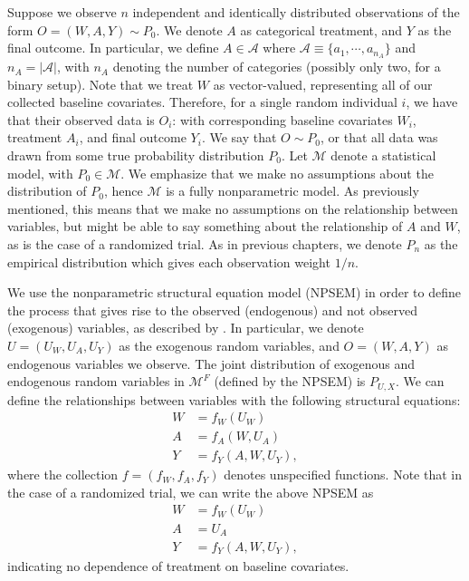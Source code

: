 \documentclass[12pt, krantz2,]{book}
\theoremstyle{definition}
\theoremstyle{definition}
\theoremstyle{definition}
\newcommand{\1}{\mathbbm{1}}
\begin{document}
Suppose we observe \(n\) independent and identically distributed observations of
the form \(O=(W,A,Y) \sim P_0\). We denote \(A\) as categorical treatment, and \(Y\)
as the final outcome. In particular, we define \(A \in \mathcal{A}\) where
\(\mathcal{A} \equiv \{a_1, \cdots, a_{n_A} \}\) and \(n_A = |\mathcal{A}|\), with
\(n_A\) denoting the number of categories (possibly only two, for a binary setup).
Note that we treat \(W\) as vector-valued, representing all of our collected
baseline covariates. Therefore, for a single random individual \(i\), we have that
their observed data is \(O_i\): with corresponding baseline covariates \(W_i\),
treatment \(A_i\), and final outcome \(Y_i\). We say that \(O \sim P_0\), or that all
data was drawn from some true probability distribution \(P_0\). Let \(\mathcal{M}\)
denote a statistical model, with \(P_0 \in \mathcal{M}\). We emphasize that we
make no assumptions about the distribution of \(P_0\), hence \(\mathcal{M}\) is a
fully nonparametric model. As previously mentioned, this means that we make no
assumptions on the relationship between variables, but might be able to say
something about the relationship of \(A\) and \(W\), as is the case of a randomized
trial. As in previous chapters, we denote \(P_n\) as the empirical distribution
which gives each observation weight \(1/n\).

We use the nonparametric structural equation model (NPSEM) in order to define
the process that gives rise to the observed (endogenous) and not observed
(exogenous) variables, as described by \citet{pearl2009causality}. In particular, we
denote \(U=(U_W,U_A,U_Y)\) as the exogenous random variables, and \(O=(W,A,Y)\) as
endogenous variables we observe. The joint distribution of exogenous and
endogenous random variables in \(\mathcal{M}^F\) (defined by the NPSEM) is
\(P_{U,X}\). We can define the relationships between variables with the following
structural equations:
\begin{align}
  W &= f_W(U_W) \\ A &= f_A(W, U_A) \\ Y &= f_Y(A, W, U_Y),
  \label{eq:npsem-mopttx}
\end{align}
where the collection \(f=(f_W,f_A,f_Y)\) denotes unspecified functions. Note that
in the case of a randomized trial, we can write the above NPSEM as
\begin{align}
  W &= f_W(U_W) \\ A &= U_A \\ Y &= f_Y(A, W, U_Y),
  \label{eq:npsem-rt-mopttx}
\end{align}
indicating no dependence of treatment on baseline covariates.
\end{document}
